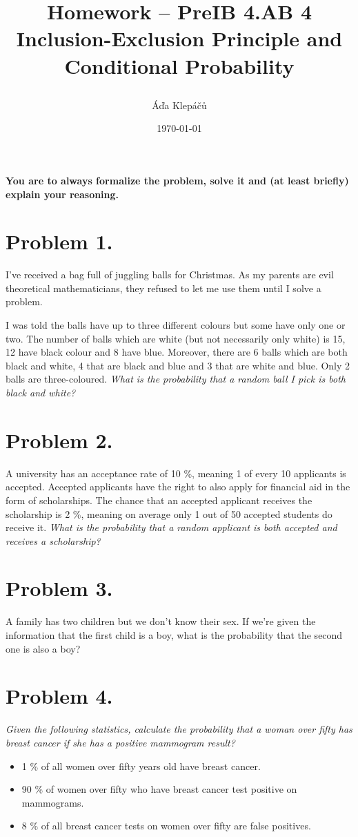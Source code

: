 \documentclass[a4paper,11pt]{article}
\title{\Huge\textsf{Homework -- PreIB 4.AB 4}\\
 \Large\textsf{Inclusion-Exclusion Principle and Conditional Probability}
 \author{Áďa Klepáčů}
 \date{\today}
}
\begin{document}
\maketitle
\thispagestyle{fancy}

\textbf{You are to always formalize the problem, solve it and (at least briefly)
explain your reasoning.}

\section*{Problem 1.}

I've received a bag full of juggling balls for Christmas. As my parents are evil
theoretical mathematicians, they refused to let me use them until I solve a
problem.

I was told the balls have up to three different colours but some have only one
or two. The number of balls which are white (but not necessarily only white) is
15, 12 have black colour and 8 have blue. Moreover, there are 6 balls which are
both black and white, 4 that are black and blue and 3 that are white and blue.
Only 2 balls are three-coloured. \emph{What is the probability that a random
ball I pick is both black and white?}

\section*{Problem 2.}
A university has an acceptance rate of 10 \%, meaning 1 of every 10 applicants
is accepted. Accepted applicants have the right to also apply for financial aid
in the form of scholarships. The chance that an accepted applicant receives the
scholarship is 2 \%, meaning on average only 1 out of 50 accepted students do
receive it. \emph{What is the probability that a random applicant is both
accepted and receives a scholarship?}

\section*{Problem 3.}
A family has two children but we don't know their sex. If we're given the
information that the first child is a boy, what is the probability that the
second one is also a boy?

\section*{Problem 4.}
\emph{Given the following statistics, calculate the probability that a woman
over fifty has breast cancer if she has a positive mammogram result?}
\begin{itemize}
 \item 1 \% of all women over fifty years old have breast cancer.
 \item 90 \% of women over fifty who have breast cancer test positive on
  mammograms.
 \item 8 \% of all breast cancer tests on women over fifty are false positives.
\end{itemize}
\end{document}
